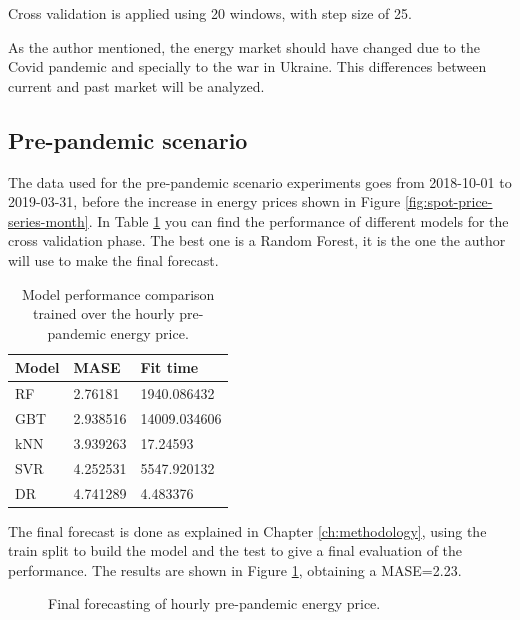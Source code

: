 Cross validation is applied using 20 windows, with step size of 25.

As the author mentioned, the energy market should have changed due to the Covid pandemic and specially to the war in Ukraine. This differences between current and past market will be analyzed.

\subsection{Pre-pandemic scenario}
The data used for the pre-pandemic scenario experiments goes from 2018-10-01 to 2019-03-31, before the increase in energy prices shown in Figure \ref{fig:spot-price-series-month}. In Table \ref{tab:cv-hourly-prep} you can find the performance of different models for the cross validation phase. The best one is a Random Forest, it is the one the author will use to make the final forecast.

\begin{table}[H]
\centering
\begin{tabular}{@{}l|l|l@{}}
\toprule
Model & MASE     & Fit time     \\ \midrule
RF    & 2.76181  & 1940.086432  \\
GBT   & 2.938516 & 14009.034606 \\
kNN   & 3.939263 & 17.24593     \\
SVR   & 4.252531 & 5547.920132  \\
DR    & 4.741289 & 4.483376     \\ \bottomrule
\end{tabular}
\caption{Model performance comparison trained over the hourly pre-pandemic energy price.}
\label{tab:cv-hourly-prep}
\end{table}

The final forecast is done as explained in Chapter \ref{ch:methodology}, using the train split to build the model and the test to give a final evaluation of the performance. The results are shown in Figure \ref{fig:forecast-hourly-pre}, obtaining a MASE=2.23.

\begin{figure}[H]
\centering
    \caption{Final forecasting of hourly pre-pandemic energy price.}
    \label{fig:forecast-hourly-pre}
\end{figure}

